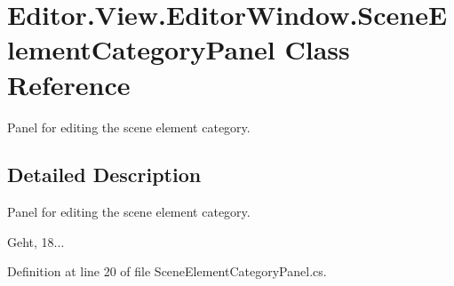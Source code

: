 \section{Editor.\-View.\-Editor\-Window.\-Scene\-Element\-Category\-Panel Class Reference}
\label{class_editor_1_1_view_1_1_editor_window_1_1_scene_element_category_panel}


Panel for editing the scene element category.  




\subsection{Detailed Description}
Panel for editing the scene element category. 

Geht, 18... 

Definition at line 20 of file Scene\-Element\-Category\-Panel.\-cs.

